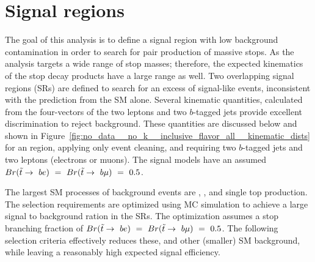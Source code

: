 \FloatBarrier
\section{Signal regions}
\label{sec:signal_regions}

The goal of this analysis is to define a signal region with low background
contamination in order to search for pair production of massive stops.
As the analysis targets a wide range of stop masses; therefore, the expected
kinematics of the stop decay products have a large range as well.
Two overlapping signal regions (SRs) are defined to search for an excess of
signal-like events, inconsistent with the prediction from the SM alone.
Several kinematic quantities, calculated from the four-vectors of the two
leptons and two $b$-tagged jets provide excellent discrimination to reject
background. 
These quantities are discussed below and shown in
Figure~\ref{fig:no_data__no_k__inclusive_flavor_all__kinematic_dists} for an
region, applying only event cleaning, and requiring two $b$-tagged jets and
two leptons (electrons or muons).
The signal models have an assumed
$Br(\tilde{t}\rightarrow~be)~=~Br(\tilde{t}\rightarrow~b\mu)~=~0.5$.

The largest SM processes of background events are \ZGAMMAJETS, \TTBAR, and
single top production.
The selection requirements are optimized using MC simulation to achieve a
large signal to background ration in the SRs.
The optimization assumes a stop branching fraction of
$Br(\tilde{t}\rightarrow~be)~=~Br(\tilde{t}\rightarrow~b\mu)~=~0.5$.
The following selection criteria effectively reduces these, and other
(smaller) SM background, while leaving a reasonably high expected signal
efficiency.

